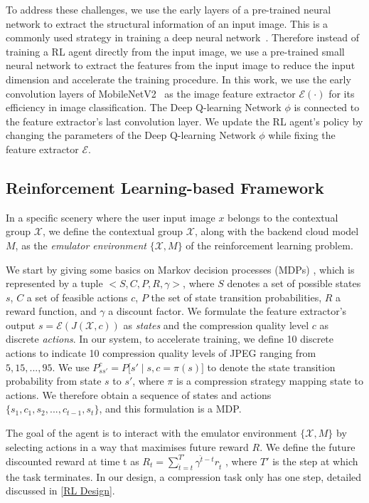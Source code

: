 To address these challenges, we use the early layers of a pre-trained neural network to extract the structural information of an input image. This is a commonly used strategy in training a deep neural network~\cite{finetunning,finetunning2}. Therefore instead of training a RL agent directly from the input image, we use a pre-trained small neural network to extract the features from the input image to reduce the input dimension and accelerate the training procedure. In this work, we use the early convolution layers of MobileNetV2~\cite{MobileNetV2} as the image feature extractor $ \mathcal{E}(\cdot) $ for its efficiency in image classification. The Deep Q-learning Network $ \phi $ is connected to the feature extractor's last convolution layer. We update the RL agent's policy by changing the parameters of the Deep Q-learning Network $ \phi $ while fixing the feature extractor $ \mathcal{E} $. %

\subsection{Reinforcement Learning-based Framework}

In a specific scenery where the user input image $ x $ belongs to the contextual group $ \mathcal{X} $, we define the contextual group $ \mathcal{X} $, along with the backend cloud model $ M $, as the \emph{emulator environment} $ \{\mathcal{X}, M\} $ of the reinforcement learning problem. 

{\color{revise3} We start by giving some basics on Markov decision processes (MDPs) \cite{MDP}, which is represented by a tuple $<S,C,P,R,\gamma>$, where $S$ denotes a set of possible states $s$, $C$ a set of feasible actions $c$, $P$ the set of state transition probabilities, $R$ a reward function, and $\gamma$ a discount factor. We formulate the feature extractor's output  $ s = \mathcal{E}(J(\mathcal{X}, c)) $ as \emph{states} and the compression quality level $ c $ as discrete \emph{actions}. In our system, to accelerate training, we define 10 discrete actions to indicate 10 compression quality levels of JPEG ranging from $ 5, 15, ...,95 $. We use $P_{ss'}^{c} = P \big[s' \mid s, c = \pi(s) \big]$ to denote the state transition probability from state $s$ to $s'$, where $\pi$ is a compression strategy mapping state to actions. We therefore obtain a sequence of states and actions $\{ s_1,c_1,s_2,...,c_{t-1},s_t \}$, and this formulation is a MDP.}

{\color{revise3} The goal of the agent is to interact with the emulator environment $ \{\mathcal{X}, M\} $ by selecting actions in a way that maximises future reward $R$. We define the future discounted reward at time t as $R_t = \sum_{\hat{t}=t}^{T'} \gamma^{\hat{t}-t}r_{\hat{t}}$ , where $T'$ is the step at which the task terminates. In our design, a compression task only has one step, detailed discussed in \ref{RL Design}}.

